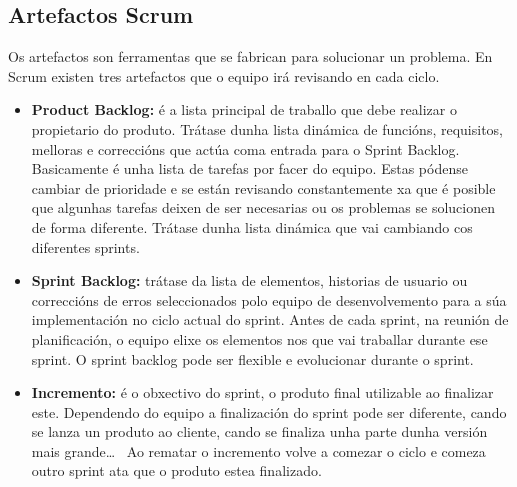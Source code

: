 \subsection{Artefactos Scrum}
Os artefactos son ferramentas que se fabrican para solucionar un problema. En Scrum existen tres artefactos que o equipo irá revisando en cada ciclo.
\begin{itemize}
	\item[--] \textbf{Product Backlog:} é a lista principal de traballo que debe realizar o propietario do produto. Trátase dunha lista dinámica de funcións, requisitos, melloras e correccións que actúa coma entrada para o Sprint Backlog. Basicamente é unha lista de tarefas por facer do equipo. Estas pódense cambiar de prioridade e se están revisando constantemente xa que é posible que algunhas tarefas deixen de ser necesarias ou os problemas se solucionen de forma diferente. Trátase dunha lista dinámica que vai cambiando cos diferentes sprints.
		~\label{scrum:productbacklog}
	\item[--] \textbf{Sprint Backlog:} trátase da lista de elementos, historias de usuario ou correccións de erros seleccionados polo equipo de desenvolvemento para a súa implementación no ciclo actual do sprint. Antes de cada sprint, na reunión de planificación, o equipo elixe os elementos nos que vai traballar durante ese sprint. O sprint backlog pode ser flexible e evolucionar durante o sprint.
		~\label{scrum:sprintbacklog}
	\item[--] \textbf{Incremento:} é o obxectivo do sprint, o produto final utilizable ao finalizar este. Dependendo do equipo a finalización do sprint pode ser diferente, cando se lanza un produto ao cliente, cando se finaliza unha parte dunha versión mais grande\dots~ Ao rematar o incremento volve a comezar o ciclo e comeza outro sprint ata que o produto estea finalizado. 
\end{itemize}

